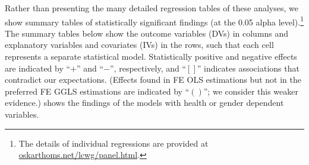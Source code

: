 \documentclass[12pt]{article}
\begin{document}
Rather than presenting the many detailed regression tables of these analyses, we show summary tables of statistically significant findings (at the 0.05 alpha level).\footnote{The details of individual regressions are provided at \href{oskarthoms.net/lcwg/}{oskarthoms.net/lcwg/panel.html}.}
The summary tables below show the outcome variables (DVs) in columns and explanatory variables and covariates (IVs) in the rows, such that each cell represents a separate statistical model. Statistically positive and negative effects are indicated by \enquote{$+$} and \enquote{$-$}, respectively, and \enquote{$[]$} indicates associations that contradict our expectations. (Effects found in FE OLS estimations but not in the preferred FE GGLS estimations are indicated by \enquote{$()$}; we consider this weaker evidence.)
 shows the findings of the models with health or gender dependent variables.
\end{document}
